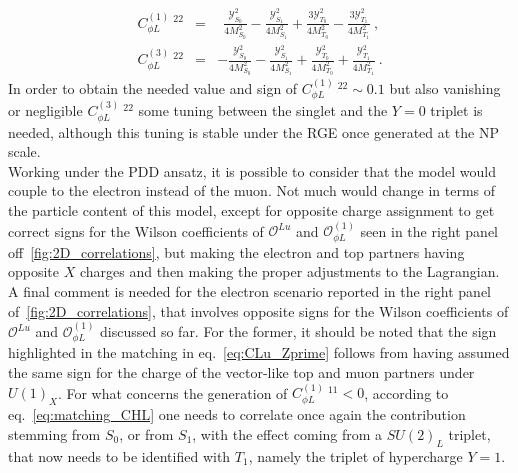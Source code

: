 \begin{eqnarray} 
	\label{eq:matching_CHL}
	C_{\phi L}^{(1)}\ ^{22 } & = &
	\ \ \frac{ \mathcal{Y}^{2}_{S_{0}}}{4 M_{S_{0}}^2} 
	- \frac{ \mathcal{Y}^{2}_{S_{1}}}{4 M_{S_{1}}^2}
	+ \frac{ 3 \mathcal{Y}^{2}_{T_{0}}}{4 M_{T_{0}}^2}
	- \frac{ 3 \mathcal{Y}^{2}_{T_{1}}}{4 M_{T_{1}}^2} \ , \\
	C_{\phi L}^{(3)} \ ^ {22} & = & 
	- \frac{ \mathcal{Y}^{2}_{S_{0}}}{4 M_{S_{0}}^2}
	- \frac{ \mathcal{Y}^{2}_{S_{1}}}{4 M_{S_{1}}^2}
	+ \frac{ \mathcal{Y}^{2}_{T_{0}}}{4 M_{T_{0}}^2}
	+ \frac{ \mathcal{Y}^{2}_{T_{1}}}{4 M_{T_{1}}^2} \ . \nonumber
\end{eqnarray}
In order to obtain the needed value and sign of  $C_{\phi L}^{(1)}\ ^{22} \sim 0.1$ but also vanishing or negligible  $C_{\phi L}^{(3)}\ ^{22}$ some tuning between the singlet and the $Y=0$ triplet is needed, although this tuning is stable under the RGE once generated at the NP scale. \\
Working under the PDD ansatz, it is possible to consider that the model would couple to the electron instead of the muon. Not much would change in terms of the particle content of this model, except for opposite charge assignment to get correct signs for the Wilson coefficients of $\mathcal O^{Lu}$ and $\mathcal O_{\phi L}^{(1)}$ seen in the right panel off~\autoref{fig:2D_correlations}, but making the electron and top partners having opposite $X$ charges and then making the proper adjustments to the Lagrangian. 
A final comment is needed for the electron scenario reported in the right panel of~\autoref{fig:2D_correlations}, that involves opposite signs for the Wilson coefficients of $\mathcal O^{Lu}$ and $\mathcal O_{\phi L}^{(1)}$ discussed so far. For the former, it should be noted that the sign highlighted in the matching in eq.~\eqref{eq:CLu_Zprime} follows from having assumed the same sign for the charge of the vector-like top and muon partners under $U(1)_{X}$. For what concerns the generation of $C_{\phi L}^{(1)} \ ^{11} < 0 $, according to eq.~\eqref{eq:matching_CHL} one needs to correlate once again the contribution stemming from $S_{0}$, or from $S_{1}$, with the effect coming from a $SU(2)_{L}$ triplet, that now needs to be identified with $T_{1}$, namely the triplet of hypercharge $Y=1$.


